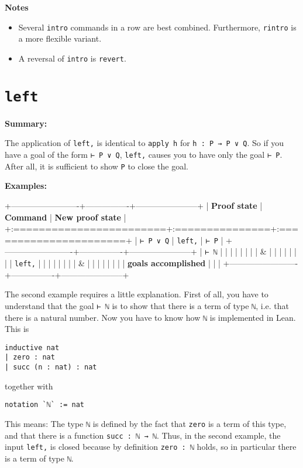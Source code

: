 \documentclass{memoir}
\begin{document}
\textbf{Notes}

\begin{itemize}
\item Several \Verb|intro| commands in a row are best combined. Furthermore,  \Verb|rintro| is a more flexible variant.\item A reversal of \Verb|intro| is \Verb|revert|.

\end{itemize}




\section{\Verb|left|}

\textbf{Summary:}

The application of \Verb|left,| is identical to \Verb|apply h| for \Verb|h : P → P ∨ Q|. So if you have a goal of the form \Verb|⊢ P ∨ Q|, \Verb|left,| causes you to have only the goal \Verb|⊢ P|. After all, it is sufficient to show \Verb|P| to close the goal.

\textbf{Examples:}

+-------------------------+----------------+-----------------------+
| \textbf{Proof state} | \textbf{Command} | \textbf{New proof state} |
+:========================+:===============+:======================+
| \Verb|⊢ P ∨ Q| | \Verb|left,| | \Verb|⊢ P| |
+-------------------------+----------------+-----------------------+
| \Verb|⊢ ℕ| | | |
| | | |
| & | | |
| | | |
| \Verb|left,| | | |
| | | |
| & | | |
| | | |
| \textbf{goals accomplished} | | |
+-------------------------+----------------+-----------------------+

The second example requires a little explanation. First of all, you have to understand that the goal \Verb|⊢ ℕ| is to show that there is a term of type \Verb|ℕ|, i.e. that there is a natural number. Now you have to know how \Verb|ℕ| is implemented in Lean. This is

\begin{verbatim}
inductive nat
| zero : nat
| succ (n : nat) : nat

\end{verbatim}


together with

\begin{verbatim}
notation `ℕ` := nat

\end{verbatim}


This means: The type \Verb|ℕ| is defined by the fact that \Verb|zero| is a term of this type, and that there is a function \Verb|succ : ℕ → ℕ|. Thus, in the second example, the input \Verb|left,| is closed because by definition \Verb|zero : ℕ| holds, so in particular there is a term of type \Verb|ℕ|.
\end{document}
